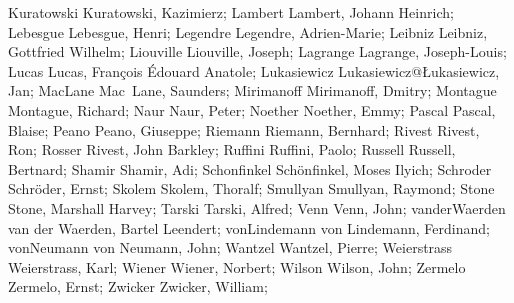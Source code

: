 \DefFriend Kuratowski       Kuratowski, Kazimierz;
\DefFriend Lambert          Lambert, Johann Heinrich;
\DefFriend Lebesgue         Lebesgue, Henri;
\DefFriend Legendre         Legendre, Adrien-Marie;
\DefFriend Leibniz          Leibniz, Gottfried Wilhelm;
\DefFriend Liouville        Liouville, Joseph;
\DefFriend Lagrange         Lagrange, Joseph-Louis;
\DefFriend Lucas            Lucas, François Édouard Anatole;
\DefFriend Lukasiewicz      Lukasiewicz@Łukasiewicz, Jan;
\DefFriend MacLane          Mac~Lane, Saunders;
\DefFriend Mirimanoff       Mirimanoff, Dmitry;
\DefFriend Montague         Montague, Richard;
\DefFriend Naur             Naur, Peter;
\DefFriend Noether          Noether, Emmy;
\DefFriend Pascal           Pascal, Blaise;
\DefFriend Peano            Peano, Giuseppe;
\DefFriend Riemann          Riemann, Bernhard;
\DefFriend Rivest           Rivest, Ron;
\DefFriend Rosser           Rivest, John Barkley;
\DefFriend Ruffini          Ruffini, Paolo;
\DefFriend Russell          Russell, Bertnard;
\DefFriend Shamir           Shamir, Adi;
\DefFriend Schonfinkel      Schönfinkel, Moses Ilyich;
\DefFriend Schroder         Schröder, Ernst;
\DefFriend Skolem           Skolem, Thoralf;
\DefFriend Smullyan         Smullyan, Raymond;
\DefFriend Stone            Stone, Marshall Harvey;
\DefFriend Tarski           Tarski, Alfred;
\DefFriend Venn             Venn, John;
\DefFriend vanderWaerden    van der Waerden, Bartel Leendert;
\DefFriend vonLindemann     von Lindemann, Ferdinand;
\DefFriend vonNeumann       von Neumann, John;
\DefFriend Wantzel          Wantzel, Pierre;
\DefFriend Weierstrass      Weierstrass, Karl;
\DefFriend Wiener           Wiener, Norbert;
\DefFriend Wilson           Wilson, John;
\DefFriend Zermelo          Zermelo, Ernst;
\DefFriend Zwicker          Zwicker, William;
